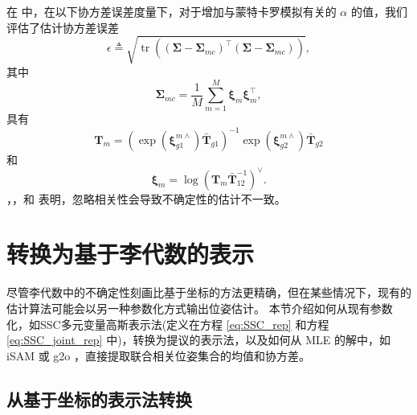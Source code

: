 在  中，在以下协方差误差度量下，对于增加与蒙特卡罗模拟有关的 $\alpha$ 的值，我们评估了估计协方差误差 
\begin{equation}
    \epsilon \triangleq \sqrt{\operatorname{tr}\left( (\boldsymbol{\Sigma} - \boldsymbol{\Sigma}_{mc})^\top (\boldsymbol{\Sigma} - \boldsymbol{\Sigma}_{mc}) \right)}, \label{eq:cov_error}
\end{equation}
其中 
\begin{equation}
\boldsymbol{\Sigma}_{mc} = \frac{1}{M}\sum_{m=1}^M \boldsymbol{\xi}_m \boldsymbol{\xi}_m^{\top},\label{eq:sample_mc_cov}
\end{equation}
具有 
\begin{equation}
\mathbf{T}_m = (\operatorname{exp}(\boldsymbol{\xi}_{g1}^{m\wedge})\bar{\mathbf{T}}_{g1})^{-1}\operatorname{exp}(\boldsymbol{\xi}_{g2}^{m\wedge})\bar{\mathbf{T}}_{g2} \label{eq:sample_mc_mean}
\end{equation}
和 
\begin{equation}
\boldsymbol{\xi}_m = \operatorname{log}(\mathbf{T}_m \bar{\mathbf{T}}_{12}^{-1})^\vee.   
\label{eq:sample_mc_xi}
\end{equation}
，，和  表明，忽略相关性会导致不确定性的估计不一致。

\section{转换为基于李代数的表示}
\label{sec:conversion}

尽管李代数中的不确定性刻画比基于坐标的方法更精确，但在某些情况下，现有的估计算法可能会以另一种参数化方式输出位姿估计。 
本节介绍如何从现有参数化，如SSC多元变量高斯表示法(定义在方程 \eqref{eq:SSC_rep} 和方程 \eqref{eq:SSC_joint_rep} 中)，转换为提议的表示法，以及如何从 MLE 的解中，如iSAM \cite{kaess2008isam} 或 g2o \cite{kummerle2011g2o}，直接提取联合相关位姿集合的均值和协方差。  

\subsection{从基于坐标的表示法转换}

